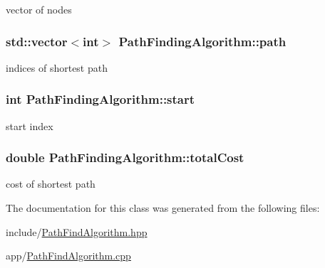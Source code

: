 vector of nodes 

\hypertarget{classPathFindingAlgorithm_ab177b2276cdf28fb77361bff19745b17}{
\subsubsection[{path}]{\setlength{\rightskip}{0pt plus 5cm}std\-::vector$<$int$>$ Path\-Finding\-Algorithm\-::path\hspace{0.3cm}{\ttfamily [protected]}}}\label{classPathFindingAlgorithm_ab177b2276cdf28fb77361bff19745b17}


indices of shortest path 

\hypertarget{classPathFindingAlgorithm_a1c31bd6b8c57459c32ada19cf9bf412a}{
\subsubsection[{start}]{\setlength{\rightskip}{0pt plus 5cm}int Path\-Finding\-Algorithm\-::start\hspace{0.3cm}{\ttfamily [protected]}}}\label{classPathFindingAlgorithm_a1c31bd6b8c57459c32ada19cf9bf412a}


start index 

\hypertarget{classPathFindingAlgorithm_ad6a91f82618d6a7a95900b5c63337837}{
\subsubsection[{total\-Cost}]{\setlength{\rightskip}{0pt plus 5cm}double Path\-Finding\-Algorithm\-::total\-Cost\hspace{0.3cm}{\ttfamily [protected]}}}\label{classPathFindingAlgorithm_ad6a91f82618d6a7a95900b5c63337837}


cost of shortest path 



The documentation for this class was generated from the following files\-:\begin{DoxyCompactItemize}
\item 
include/\hyperlink{PathFindAlgorithm_8hpp}{Path\-Find\-Algorithm.\-hpp}\item 
app/\hyperlink{PathFindAlgorithm_8cpp}{Path\-Find\-Algorithm.\-cpp}\end{DoxyCompactItemize}
